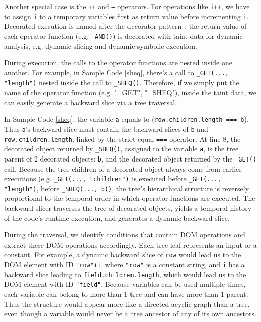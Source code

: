 Another special case is the {\tt ++} and {\tt --} operators.  For operations like {\tt i++}, we have to assign {\tt i} to a temporary variables first as return value before incrementing {\tt i}.
Decorated execution is named after the decorator pattern~\cite{decoratorPattern}; the return value of each operator function (e.g. {\tt \_AND()}) is decorated with taint data for dynamic analysis, e.g. dynamic slicing and dynamic symbolic execution.  


During execution, the calls to the operator functions are nested inside one another.  For example, in Sample Code \ref{sheq}, there's a call to {\tt \_GET(..., "length")} nested inside the call to {\tt \_SHEQ()}.  
Therefore, if we simply put the name of the operator function (e.g. "\_GET", "\_SHEQ"), inside the taint data, we can easily generate a backward slice via a tree traversal.  

In Sample Code \ref{sheq}, the variable {\tt a} equals to ({\tt row.children.length === b}).  Thus {\tt a}'s backward slice must contain the backward slices of {\tt b} and {\tt row.children.length}, linked by the strict equal {\tt ===} operator.  
At line 8, the decorated object returned by {\tt \_SHEQ()}, assigned to the variable {\tt a}, is the tree parent of 2 decorated objects: {\tt b}, and the decorated object returned by the {\tt \_GET()} call.  
Because the tree children of a decorated object always come from earlier executions (e.g. {\tt \_GET(..., "children")} is executed before {\tt \_GET(..., "length")}, before {\tt \_SHEQ(..., b))}, the tree's hierarchical structure is reversely proportional to the temporal order in which operator functions are executed.  
The backward slicer traverses the tree of decorated objects, yields a temporal history of the code's runtime execution, and generates a dynamic backward slice.  

During the traversal, we identify conditions that contain DOM operations and extract these DOM operations accordingly.  Each tree leaf represents an input or a constant.  
For example, a dynamic backward slice of {\tt row} would lead us to the DOM element with ID {\tt "row"+i}, where {\tt "row"} is a constant string, and {\tt i} has a backward slice leading to {\tt field.children.length}, which would lead us to the DOM element with ID {\tt "field"}.  
Because variables can be used multiple times, each variable can belong to more than 1 tree and can have more than 1 parent.  Thus the structure would appear more like a directed acyclic graph than a tree, even though a variable would never be a tree ancestor of any of its own ancestors.  


